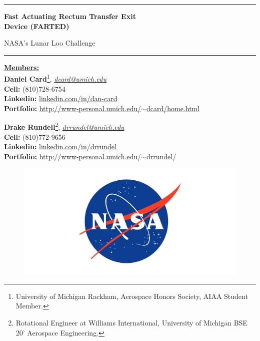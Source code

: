 \thispagestyle{empty}
    
\rule{\textwidth}{3pt}

\vspace{1cm}
\textbf{\LARGE{Fast Actuating Rectum Transfer Exit}\\ Device (FARTED)}

NASA's Lunar Loo Challenge

\rule{\textwidth}{1pt}

\vspace{1cm}
\begin{flushleft}
    \underline{\textbf{\LARGE{Members:}}}\\
    \textbf{Daniel Card}\footnote{University of Michigan Rackham, Aerospace Honors Society, AIAA Student Member.}, \href{mailto:dcard@umich.edu}{\textit{dcard@umich.edu}}\\
    \textbf{Cell:} (810)728-6754\\
    \textbf{Linkedin:} \href{http://www.linkedin.com/in/dan-card}{linkedin.com/in/dan-card}\\
    \textbf{Portfolio:}  \href{http://www-personal.umich.edu/~dcard/home.html}{http://www-personal.umich.edu/$\sim$dcard/home.html}

    
    \textbf{Drake Rundell}\footnote{Rotational Engineer at Williams International, University of Michigan BSE 20' Aerospace Engineering.}, \href{mailto:drrundel}{\textit{drrundel@umich.edu}}\\
    \textbf{Cell:} (810)772-9656\\
    \textbf{Linkedin:} \href{http://www.linkedin.com/in/drrundel}{linkedin.com/in/drrundel}\\
    \textbf{Portfolio:}  \href{http://www-personal.umich.edu/~drrundel/}{http://www-personal.umich.edu/$\sim$drrundel/}
\end{flushleft}

\begin{figure}[h]
    \centering
    \includegraphics[width = \linewidth]{administrative/nasa-logo-web-rgb.png}
\end{figure}

\vfill
